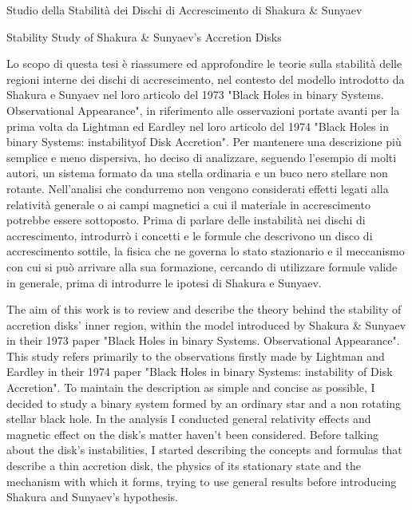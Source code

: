 \documentclass[a4paper]{article}
\begin{document}
Studio della Stabilità dei Dischi di Accrescimento di Shakura & Sunyaev

Stability Study of Shakura & Sunyaev's Accretion Disks

Lo scopo di questa tesi è riassumere ed approfondire le teorie sulla stabilità delle regioni interne dei dischi di accrescimento, nel contesto del modello introdotto da Shakura e Sunyaev nel loro articolo del 1973 "Black Holes in binary Systems. Observational Appearance", in riferimento alle osservazioni portate avanti per la prima volta da Lightman ed Eardley nel loro articolo del 1974 "Black Holes in binary Systems: instabilityof Disk Accretion".
Per mantenere una descrizione più semplice e meno dispersiva, ho deciso di analizzare, seguendo l’esempio di molti autori, un sistema formato da una stella ordinaria e un buco nero stellare non rotante.
Nell’analisi che condurremo non vengono considerati effetti legati alla relatività generale o ai campi magnetici a cui il materiale in accrescimento potrebbe essere sottoposto.
Prima di parlare delle instabilità nei dischi di accrescimento, introdurrò i
concetti e le formule che descrivono un disco di accrescimento sottile, la fisica che ne governa lo stato stazionario e il meccanismo con cui si può arrivare alla sua formazione, cercando di utilizzare formule valide in generale, prima di introdurre le ipotesi di Shakura e Sunyaev.

The aim of this work is to review and describe the theory behind the stability of accretion disks' inner region, within the model introduced by Shakura & Sunyaev in their 1973 paper "Black Holes in binary Systems. Observational Appearance". This study refers primarily to the observations firstly made by Lightman and Eardley in their 1974 paper "Black Holes in binary Systems: instability of Disk Accretion".
To maintain the description as simple and concise as possible, I decided to study a binary system formed by an ordinary star and a non rotating stellar black hole.
In the analysis I conducted general relativity effects and magnetic effect on the disk's matter haven't been considered.
Before talking about the disk's instabilities, I started describing the concepts and formulas that describe a thin accretion disk, the physics of its stationary state and the mechanism with which it forms, trying to use general results before introducing Shakura and Sunyaev's hypothesis.
\end{document}
